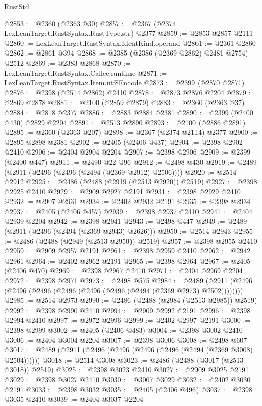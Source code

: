 \begin{lexlean}{RustStd}
\begin{coremodule}
{\begin{coremodule}
{{{{{{{{{{{{{{{{{{{{{{{{{{{{{{{{{{{{{{{{{{{{{{{{{{@2853 := @2360 (@2363 @30)
@2857 := @2367 (@2374 LexLeanTarget.RustSyntax.RustType.str) @2377
@2859 := @2853 @2857 @2111
@2860 := LexLeanTarget.RustSyntax.IdentKind.operand
@2861 := @2361 @2860
@2862 := @2861 @394
@2868 := @2385 (@2386 (@2369 @2862) @2481 @2754) @2512
@2869 := @2383 @2868
@2870 := LexLeanTarget.RustSyntax.Callee.runtime
@2871 := LexLeanTarget.RustSyntax.Item.utf8Encode
@2873 := @2399 (@2870 @2871)
@2876 := @2398 (@2514 @2862) @2410
@2878 := @2873 @2876 @2204
@2879 := @2869 @2878
@2881 := @2100 (@2859 @2879)
@2883 := @2360 (@2363 @37)
@2884 := @2818 @2377
@2886 := @2883 @2884 @2381
@2890 := @2399 (@2400 @430) @2829 @2204
@2891 := @2513 @2890
@2893 := @2100 (@2886 @2891)
@2895 := @2360 (@2363 @207)
@2898 := @2367 (@2374 @2114) @2377
@2900 := @2895 @2898 @2381
@2902 := @2405 (@2406 @437)
@2904 := @2398 @2902 @2410
@2906 := @2404 @2904 @2204
@2907 := @2398 @2906
@2909 := @2399 (@2400 @447)
@2911 := @2490 @22 @96
@2912 := @2498 @430
@2919 := @2489 (@2911 (@2496 (@2496 (@2494 (@2369 @2912) @2506))))
@2920 := @2514 @2912
@2925 := @2486 (@2488 (@2919 (@2513 @2920)) @2519)
@2927 := @2398 @2925 @2410
@2929 := @2909 @2927 @2191
@2931 := @2398 @2929 @2410
@2932 := @2907 @2931
@2934 := @2402 @2932 @2191
@2935 := @2398 @2934
@2937 := @2405 (@2406 @457)
@2939 := @2398 @2937 @2410
@2941 := @2404 @2939 @2204
@2942 := @2398 @2941
@2943 := @2498 @447
@2949 := @2489 (@2911 (@2496 (@2494 (@2369 @2943) @2626)))
@2950 := @2514 @2943
@2955 := @2486 (@2488 (@2949 (@2513 @2950)) @2519)
@2957 := @2398 @2955 @2410
@2959 := @2909 @2957 @2191
@2961 := @2398 @2959 @2410
@2962 := @2942 @2961
@2964 := @2402 @2962 @2191
@2965 := @2398 @2964
@2967 := @2405 (@2406 @470)
@2969 := @2398 @2967 @2410
@2971 := @2404 @2969 @2204
@2972 := @2398 @2971
@2973 := @2498 @575
@2984 := @2489 (@2911 (@2496 (@2496 (@2496 (@2496 (@2496 (@2496 (@2494 (@2369 @2973) @2502))))))))
@2985 := @2514 @2973
@2990 := @2486 (@2488 (@2984 (@2513 @2985)) @2519)
@2992 := @2398 @2990 @2410
@2994 := @2909 @2992 @2191
@2996 := @2398 @2994 @2410
@2997 := @2972 @2996
@2999 := @2402 @2997 @2191
@3000 := @2398 @2999
@3002 := @2405 (@2406 @483)
@3004 := @2398 @3002 @2410
@3006 := @2404 @3004 @2204
@3007 := @2398 @3006
@3008 := @2498 @607
@3017 := @2489 (@2911 (@2496 (@2496 (@2496 (@2496 (@2494 (@2369 @3008) @2504))))))
@3018 := @2514 @3008
@3023 := @2486 (@2488 (@3017 (@2513 @3018)) @2519)
@3025 := @2398 @3023 @2410
@3027 := @2909 @3025 @2191
@3029 := @2398 @3027 @2410
@3030 := @3007 @3029
@3032 := @2402 @3030 @2191
@3033 := @2398 @3032
@3035 := @2405 (@2406 @496)
@3037 := @2398 @3035 @2410
@3039 := @2404 @3037 @2204
}}}}}}}}}}}}}}}}}}}}}}}}}}}}}}}}}}}}}}}}}}}}}}}}}}
\end{coremodule}}
\end{coremodule}
\end{lexlean}
